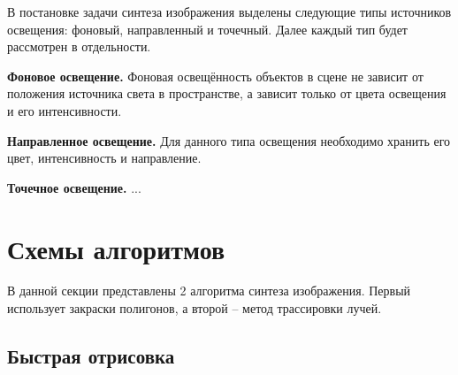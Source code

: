 В постановке задачи синтеза изображения выделены следующие типы источников освещения: фоновый, направленный и точечный. Далее каждый тип будет рассмотрен в отдельности.

\textbf{Фоновое освещение.} Фоновая освещённость объектов в сцене не зависит от положения источника света в пространстве, а зависит только от цвета освещения и его интенсивности.

\textbf{Направленное освещение.} Для данного типа освещения необходимо хранить его цвет, интенсивность и направление.

\textbf{Точечное освещение.} ...

\section{Схемы алгоритмов}

В данной секции представлены 2 алгоритма синтеза изображения. Первый использует закраски полигонов, а второй -- метод трассировки лучей.

\subsection{Быстрая отрисовка}

